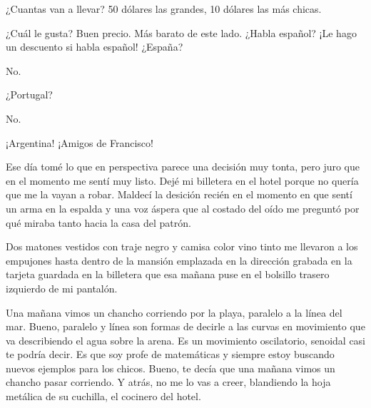 \documentclass[12pt,twoside,openright,a5paper]{book}
\begin{document}
¿Cuantas van a llevar? 50 dólares las grandes, 10 dólares las más chicas.


\vspace{0.5cm}
\hrulefill\hspace{0.2cm} \decofourleft\decofourright \hspace{0.2cm} \hrulefill
\vspace{0.5cm}

¿Cuál le gusta? Buen precio. Más barato de este lado. ¿Habla español? ¡Le
hago un descuento si habla español! ¿España?

No.

¿Portugal?

No.

¡Argentina! ¡Amigos de Francisco!


\vspace{0.5cm}
\hrulefill\hspace{0.2cm} \decofourleft\decofourright \hspace{0.2cm} \hrulefill
\vspace{0.5cm}

Ese día tomé lo que en perspectiva parece una decisión muy tonta, pero
juro que en el momento me sentí muy listo. Dejé mi billetera en el hotel
porque no quería que me la vayan a robar. Maldecí la desición recién
en el momento en que sentí un arma en la espalda y una voz áspera que
al costado del oído me preguntó por qué miraba tanto hacia la casa del
patrón.

Dos matones vestidos con traje negro y camisa color vino tinto
me llevaron a los empujones hasta dentro de la mansión emplazada en la
dirección grabada en la tarjeta guardada en la billetera que esa mañana
puse en el bolsillo trasero izquierdo de mi pantalón.



\vspace{0.5cm}
\hrulefill\hspace{0.2cm} \decofourleft\decofourright \hspace{0.2cm} \hrulefill
\vspace{0.5cm}

Una mañana vimos un chancho corriendo por la playa, paralelo a la línea del
mar. Bueno, paralelo y línea son formas de decirle a las curvas en movimiento
que va describiendo el agua sobre la arena. Es un movimiento oscilatorio,
senoidal casi te podría decir. Es que soy profe de matemáticas y siempre
estoy buscando nuevos ejemplos para los chicos. Bueno, te decía que una
mañana vimos un chancho pasar corriendo. Y atrás, no me lo vas a creer,
blandiendo la hoja metálica de su cuchilla, el cocinero del hotel.
\end{document}
